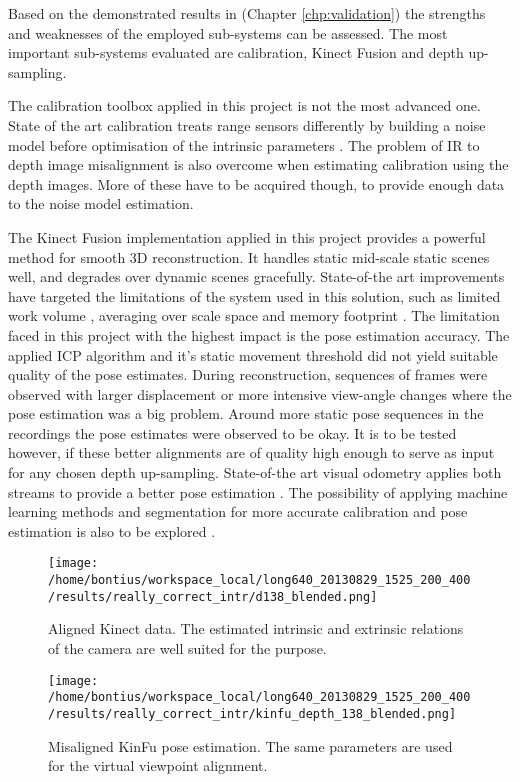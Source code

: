 \documentclass{ucl_thesis}
\newcommand{\chpref}[1]{(Chapter \ref{#1})}
\begin{document}
\par Based on the demonstrated results in \chpref{chp:validation} the strengths and weaknesses of the employed sub-systems can be assessed. The most important sub-systems evaluated are calibration, Kinect Fusion and depth up-sampling.
\par The calibration toolbox applied in this project is not the most advanced one. State of the art calibration treats range sensors differently by building a noise model before optimisation of the intrinsic parameters \citep{calibration_herrera}. The problem of IR to depth image misalignment is also overcome when estimating calibration using the depth images. More of these have to be acquired though, to provide enough data to the noise model estimation.
\par The Kinect Fusion implementation applied in this project provides a powerful method for smooth 3D reconstruction. It handles static mid-scale static scenes well, and degrades over dynamic scenes gracefully. State-of-the art improvements have targeted the limitations of the system used in this solution, such as limited work volume \citep{Whelan13iros}, averaging over scale space \citep{Fuhrmann:2011} and memory footprint \citep{keller13realtime}. The limitation faced in this project with the highest impact is the pose estimation accuracy. The applied ICP algorithm and it's static movement threshold did not yield suitable quality of the pose estimates. During reconstruction, sequences of frames were observed with larger displacement or more intensive view-angle changes where the pose estimation was a big problem. Around more static pose sequences in the recordings the pose estimates were observed to be okay. It is to be tested however, if these better alignments are of quality high enough to serve as input for any chosen depth up-sampling. State-of-the art visual odometry applies both streams to provide a better pose estimation \citep{Whelan13icra}. The possibility of applying machine learning methods and segmentation for more accurate calibration and pose estimation is also to be explored \citep{malisiewicz-iccv11}.

\begin{figure}[h!]\centering
	\begin{minipage}[b]{0.49\linewidth}
		\texttt{[image: /home/bontius/workspace\_local/long640\_20130829\_1525\_200\_400/results/really\_correct\_intr/d138\_blended.png]}
		\caption{Aligned Kinect data. The estimated intrinsic and extrinsic relations of the camera are well suited for the purpose.}
	\end{minipage}
	\begin{minipage}[b]{0.49\linewidth}
		\texttt{[image: /home/bontius/workspace\_local/long640\_20130829\_1525\_200\_400/results/really\_correct\_intr/kinfu\_depth\_138\_blended.png]}
		\caption{Misaligned KinFu pose estimation. The same parameters are used for the virtual viewpoint alignment.}
		\label{fig:limit_kinfu_pose}
	\end{minipage}
\end{figure}
\end{document}

